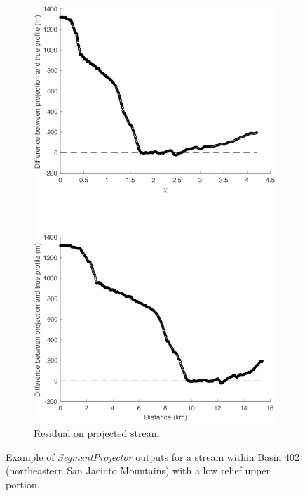 \begin{figure}[H]
\begin{subfigure}{.5\textwidth}
		\includegraphics[width=.8\linewidth]{PNGs/B402_ProjResidual_1.png}
		\caption{Residual on projected stream}
		\label{fig:p1sub2}
	\end{subfigure}
	\caption{Example of \textit{SegmentProjector} outputs for a stream within Basin 402 (northeastern San Jacinto Mountains) with a low relief upper portion.}
	\label{fig:proj1}
\end{figure}


